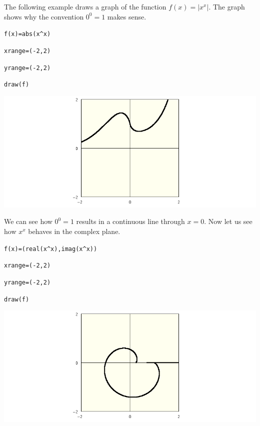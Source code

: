 \noindent
The following example draws a graph of the function $f(x)=|x^x|$.
The graph shows why the convention $0^0=1$ makes sense.

\medskip
\verb$f(x)=abs(x^x)$

\verb$xrange=(-2,2)$

\verb$yrange=(-2,2)$

\verb$draw(f)$

\begin{center}
\includegraphics[scale=0.4]{zerozero.png}
\end{center}

\medskip
\noindent
We can see how $0^0=1$ results in a continuous line through $x=0$.
Now let us see how $x^x$ behaves in the complex plane.

\medskip
\verb$f(x)=(real(x^x),imag(x^x))$

\verb$xrange=(-2,2)$

\verb$yrange=(-2,2)$

\verb$draw(f)$

\begin{center}
\includegraphics[scale=0.4]{zerozero2.png}
\end{center}
